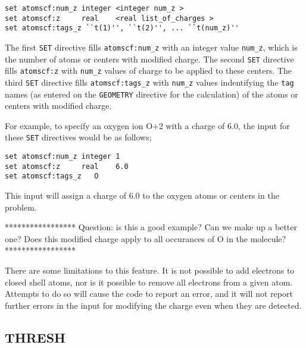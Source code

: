 
\begin{verbatim}
set atomscf:num_z integer <integer num_z >
set atomscf:z     real    <real list_of_charges >
set atomscf:tags_z ``t(1)'', ``t(2)'', ... ``t(num_z)''
\end{verbatim}

The first \verb+SET+ directive fills \verb+atomscf:num_z+ with an
integer value \verb+num_z+, which is the number of atoms or centers 
with modified charge.
The second \verb+SET+ directive fills \verb+atomscf:z+ with \verb+num_z+
values of charge to be applied to these centers.  The third 
\verb+SET+ directive fills \verb+atomscf:tags_z+ with \verb+num_z+ values
indentifying the
\verb+tag+ names (as entered on the \verb+GEOMETRY+ directive for the
calculation) of the atoms or centers with modified charge.

For example, to specify an oxygen ion O+2 with a charge of 6.0, the input
for these \verb+SET+ directives would be as follows;

\begin{verbatim}
set atomscf:num_z integer 1
set atomscf:z     real    6.0
set atomscf:tags_z   O
\end{verbatim}

This input will assign a charge of 6.0 to the oxygen atoms or centers
in the problem.

\Large
*****************
Question: is this a good example?
Can we make up a better one?
Does this modified charge apply to all occurances of O in the molecule?
*****************
\normalsize




There are some limitations to this feature.  It is not possible to add
electrons to closed shell atoms, nor is it possible to remove all electrons
from a given atom.  Attempts to do so will cause the code to report an error,
and it will not report further errors in the input for modifying the charge 
even when they are detected.

\subsection{THRESH}
\label{sec:thresh}

